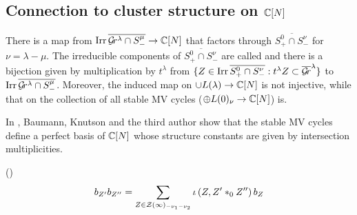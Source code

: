 \documentclass{article} %
\begin{document}
\subsection{Connection to cluster structure on $\mathbb C[N]$}
% 
There is a map from $\operatorname{Irr} \overline{\mathcal{G}\!r^\lambda\cap S^\mu_-} \to \mathbb C[N]$ that factors through  $\overline{S^0_+\cap S^\nu_-}$ for $\nu = \lambda - \mu$. The irreducible components of $ \overline{S^0_+\cap S^\nu_-}$ are called  and there is a bijection given by multiplication by $t^\lambda$ from $\{Z\in \operatorname{Irr} \overline{S^0_+\cap S^\nu_-} : t^\lambda Z \subset\overline{\mathcal{G}\!r}^\lambda\}$ to $\operatorname{Irr} \overline{\mathcal{G}\!r^\lambda\cap S^\mu_-} $. Moreover, the induced map on $\cup L(\lambda)\to\mathbb C[N]$ is not injective, while that on the collection of all stable MV cycles ($\oplus L(0)_\nu\to\mathbb C[N]$) is. 

In \cite{baumann2019mirkovic}, Baumann, Knutson and the third author show that the stable MV cycles define a perfect basis of $\mathbb C[N]$ whose structure constants are given by intersection multiplicities. 
% 

\begin{theorem}
    (\cite[Theorem~7.11]{baumann2019mirkovic})
$$
b_{Z'}b_{Z''} = \sum_{Z\in\mathcal Z(\infty)_{-\nu_1 - \nu_2}} \iota\left(
    Z, Z' \ast_0 Z''
\right) b_Z 
$$
\end{theorem}

\end{document}
